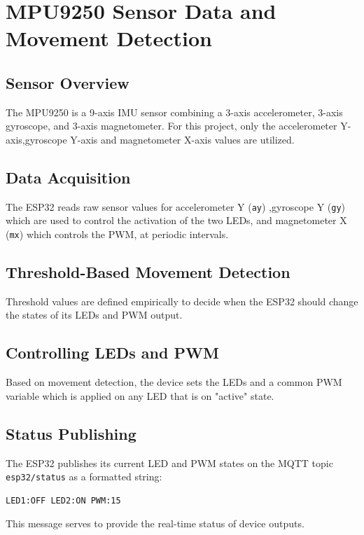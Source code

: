 \documentclass[a4paper,12pt]{article}
\begin{document}
\section{MPU9250 Sensor Data and Movement Detection}

\subsection{Sensor Overview}

The MPU9250 is a 9-axis IMU sensor combining a 3-axis accelerometer, 
3-axis gyroscope, and 3-axis magnetometer. 
For this project, only the accelerometer Y-axis,gyroscope Y-axis and magnetometer X-axis values 
are utilized.
\subsection{Data Acquisition}

The ESP32 reads raw sensor values for accelerometer Y (\texttt{ay}) 
,gyroscope Y (\texttt{gy}) which are used to control the activation of the two LEDs, 
and magnetometer X (\texttt{mx}) which controls the PWM, at periodic intervals.

\subsection{Threshold-Based Movement Detection}

Threshold values are defined empirically to decide when the ESP32 should 
change the states of its LEDs and PWM output.


\subsection{Controlling LEDs and PWM}

Based on movement detection, the device sets the LEDs and a common PWM variable which is applied on 
any LED that is on "active" state.

\subsection{Status Publishing}

The ESP32 publishes its current LED and PWM states 
on the MQTT topic \texttt{esp32/status} as a formatted string:

{\scriptsize
\begin{verbatim}
LED1:OFF LED2:ON PWM:15
\end{verbatim}
}
This message serves to provide the
real-time status of device outputs.
\end{document}
